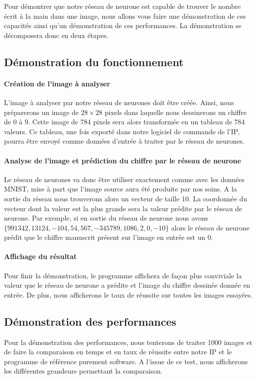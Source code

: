 Pour démontrer que notre réseau de neurone est capable de trouver le nombre écrit à la main 
dans une image, nous allons vous faire une démonstration de ces capacités ainsi qu'un démonstration de ces performances. 
La démonstration se décomposera donc en deux étapes.

\subsection{Démonstration du fonctionnement}

\paragraph{Création de l'image à analyser\\}
	L'image à analyser par notre réseau de neurones doit être créée. Ainsi, nous préparerons 
	un image de $28 \times 28$ pixels dans laquelle nous dessinerons un chiffre de 0 à 9. 
	Cette image de 784 pixels sera alors transformée en un tableau de 784 valeurs. 
	Ce tableau, une fois exporté dans notre logiciel de commande de l'IP, 
	pourra être envoyé comme données d'entrée à traiter par le réseau de neurones.
	
\paragraph{Analyse de l'image et prédiction du chiffre par le réseau de neurone\\}
	Le réseau de neurones va donc être utiliser exactement comme avec les données MNIST\cite{lecun2010mnist}, 
	mise à part que l'image source aura été produite par nos soins. A la sortie du réseau 
	nous trouverons alors un vecteur de taille 10. La coordonnée du vecteur dont la 
	valeur est la plus grande sera la valeur prédite par le réseau de neurone. 
	Par exemple, si en sortie du réseau de neurone nous avons $\{991342, 13124, -104, 54, 567, -345789, 1086, 2, 0, -10\}$ 
	alors le réseau de neurone prédit que le chiffre manuscrit présent sur l'image en entrée est un 0.
	
\paragraph{Affichage du résultat\\}
	Pour finir la démonstration, le programme affichera de façon plus conviviale 
	la valeur que le réseau de neurone a prédite et l'image du chiffre dessinée donnée en entrée. 
	De plus, nous afficherons le taux de réussite sur toutes les images essayées.
	
\subsection{Démonstration des performances}
	Pour la démonstration des performances, nous tenterons de traiter 1000 images 
	et de faire la comparaison en temps et en taux de réussite entre notre IP 
	et le programme de référence purement software. A l'issue de ce test, nous afficherons les 
	différentes grandeurs permettant la comparaison.
